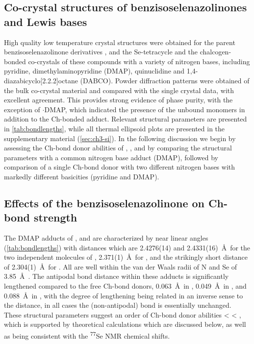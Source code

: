 \begin{refsection}
\subsection{Co-crystal structures of benzisoselenazolinones and Lewis bases}
High quality low temperature crystal structures were obtained for the parent benzisoselenazolinone derivatives  \autocite{Thomas2015},  and the Se-tetracycle  and the chalcogen-bonded co-crystals of these compounds with a variety of nitrogen bases, including pyridine, dimethylaminopyridine (DMAP), quinuclidine and 1,4-diaza\-bicyclo[2.2.2]\-octane (DABCO).
Powder diffraction patterns were obtained of the bulk co-crystal material and compared with the single crystal data, with excellent agreement.
This provides strong evidence of phase purity, with the exception of $ \cdot $DMAP, which indicated the presence of the unbound monomers in addition to the Ch-bonded adduct.
Relevant structural parameters are presented in \cref{tab:bondlengths}, while all thermal ellipsoid plots are presented in the supplementary material (\cref{sec:ch3-si}).
In the following discussion we begin by assessing the Ch-bond donor abilities of , , and  by comparing the structural parameters with a common nitrogen base adduct (DMAP), followed by comparison of a single Ch-bond donor  with two different nitrogen bases with markedly different basicities (pyridine and DMAP).

\subsection{Effects of the benzisoselenazolinone on Ch-bond strength}
The DMAP adducts of ,  and  are characterized by near linear  angles (\cref{tab:bondlengths}) with distances which are 2.4276(14) and 2.4331(16)~\AA\ for the two independent molecules of , 2.371(1)~\AA\ for , and the strikingly short  distance of 2.304(1)~\AA\ for .
All are well within the van der Waals radii of N and Se of 3.85~\AA\ \autocite{Batsanov2001}.
The antipodal  bond distance within these adducts is significantly lengthened compared to the free Ch-bond donors, 0.063~\AA\ in , 0.049~\AA\ in , and 0.088~\AA\ in , with the degree of lengthening being related in an inverse sense to the distance, in all cases the (non-antipodal)  bond is essentially unchanged.
These structural parameters suggest an order of Ch-bond donor abilities  <  < , which is supported by theoretical calculations which are discussed below, as well as being consistent with the \textsuperscript{77}Se NMR chemical shifts.


\end{refsection}
